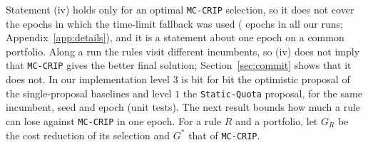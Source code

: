 \documentclass[a4paper,fleqn]{cas-sc}
\newcommand{\mcc}{\texttt{MC-CRIP}}
\begin{document}
Statement (iv) holds only for an optimal \mcc{} selection, so it does not cover the epochs in which the time-limit fallback was used (\FallbackWallEpochs{} epochs in all our runs; Appendix~\ref{app:details}), and it is a statement about one epoch on a common portfolio. Along a run the rules visit different incumbents, so (iv) does not imply that \mcc{} gives the better final solution; Section~\ref{sec:commit} shows that it does not. In our implementation level $3$ is bit for bit the optimistic proposal of the single-proposal baselines and level $1$ the \texttt{Static-Quota} proposal, for the same incumbent, seed and epoch (unit tests). The next result bounds how much a rule can lose against \mcc{} in one epoch. For a rule $R$ and a portfolio, let $G_R$ be the cost reduction of its selection and $G^*$ that of \mcc.
\end{document}
